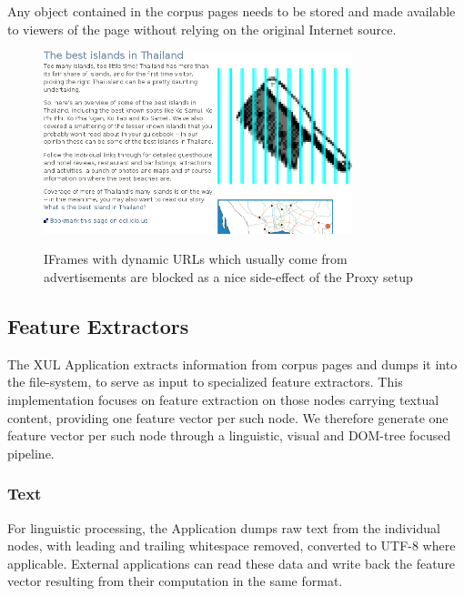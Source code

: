 Any object contained in the corpus pages needs to be stored and made available to viewers of the page without relying on the original Internet source.

\begin{figure}
	{\includegraphics[width=0.8\textwidth]{add}}
\caption{IFrames with dynamic URLs which usually come from advertisements are blocked as a nice side-effect of the Proxy setup}
\end{figure}

\subsection{Feature Extractors}

The XUL Application extracts information from corpus pages and dumps it into the file-system, to serve as input to specialized feature extractors.
This implementation focuses on feature extraction on those nodes carrying textual content, providing one feature vector per such node.
We therefore generate one feature vector per such node through a linguistic, visual and DOM-tree focused pipeline.

\subsubsection{Text}

For linguistic processing, the Application dumps raw text from the individual nodes, with leading and trailing whitespace removed, converted to UTF-8 where applicable.
External applications can read these data and write back the feature vector resulting from their computation in the same format.

